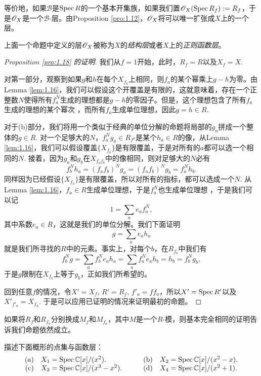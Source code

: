 等价地，如果$\mathscr{B}$是$\operatorname{Spec} R$的一个基本开集族，如果我们置$\mathscr{O}_X(\operatorname{Spec} R_f):=R_f$，于是$\mathscr{O}_X$是一个$\mathscr{B}$\hyp 层。由Proposition \ref{pro:1.12}，$\mathscr{O}_X$将可以唯一扩张成$X$上的一个层。

\begin{defi}
	上面一个命题中定义的层$\mathscr{O}_X$被称为$X$的\textit{结构层}或者$X$上的\textit{正则函数层}。
\end{defi}

\begin{proof}[Proposition \ref{pro:1.18} 的证明]
我们从$f=1$开始，此时，$R_f=R$以及$X_f=X$.

对第一部分，观察到如果$g$和$h$在每个$X_{f_a}$上相同，则$f_a$的某个幂乘上$g-h$为零。由Lemma \ref{lem:1.16}，我们可以假设这个开覆盖是有限的，这就意味着，存在一个正整数$N$使得所有$f_a^N$生成的理想都是$g-h$的零因子。但是，这个理想包含了所有$f_a$生成的理想的某个幂次%
，而所有$f_a$生成单位理想，因此$g=h\in R$.

对于(b)部分，我们将用一个类似于经典的单位分解的命题将局部的$g_a$拼成一个整体的$g\in R$. 对一个足够大的$N$，$f_a^Ng_a\in R_{f^a}$是某个$h_a\in R$的像，从Lemma \ref{lem:1.16}，我们可以假设覆盖$\{X_{f_a}\}$是有限覆盖，于是对所有的$a$都可以选一个相同的$N$. 接着，因为$g_a$和$g_b$在$X_{f_af_b}$中的像相同，则对足够大的$N$必有
\[
	f_b^Nh_a=(f_af_b)^Ng_a=(f_af_b)^Ng_b=f_a^Nh_b.
\]
同样因为已经假设$\{X_{f_a}\}$是有限覆盖，所以对所有的指标，都可以选成一个$N$. 从Lemma \ref{lem:1.16}，$f_a\in R$生成单位理想，于是$f_a^N$也生成单位理想%
，于是我们可以记
\[
	1=\sum_a e_a f_a^N,
\]
其中系数$e_a\in R$，这就是我们的单位分解。我们下面证明
\[
	g=\sum_a e_ah_a
\]
就是我们所寻找的$R$中的元素。事实上，对每个$b$，在$R_{f_b}$中我们有
\[
	f_b^N g =\sum_a f_b^N e_ah_a=\sum_a f_a^N e_a h_b=h_b=f_b^N g_b,
\]
于是$g$限制在$X_{f_b}$上等于$g_b$，正如我们所希望的。

回到任意$f$的情况，令$X'=X_f$, $R'=R_f$, $f'_a=ff_a$，所以$X'=\operatorname{Spec} R'$以及$X'_{f'_a}=X_{f_a}$. 于是可以应用已证明的情况来证明最初的命题。
\end{proof}

如果将$R_f$和$R_{f_a}$分别换成$M_f$和$M_{f_a}$，其中$M$是一个$R$\hyp 模，则基本完全相同的证明告诉我们命题依然成立。

\begin{exe}\label{exe:1.20}
描述下面概形的点集与函数层：
\[
\begin{array}{rlcrl}
\text{(a)} & X_1=\operatorname{Spec} \mathbb{C}[x]/(x^2).    &\quad & \text{(b)} & X_2=\operatorname{Spec} \mathbb{C}[x]/(x^2-x).\\
\text{(c)} & X_3=\operatorname{Spec} \mathbb{C}[x]/(x^3-x^2).&\quad & \text{(d)} & X_4=\operatorname{Spec} \mathbb{C}[x]/(x^2+1).
\end{array}
\]
\end{exe}

